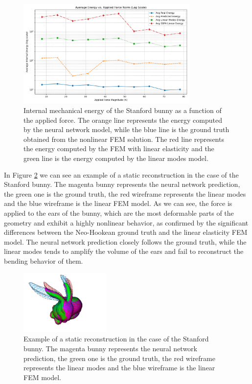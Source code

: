 \begin{figure}[H]
    \centering
    \includegraphics[width=0.8\textwidth]{Images/bunny_static_energy.png}
    \caption{Internal mechanical energy of the Stanford bunny as a function of the applied force. The orange line represents the energy computed by the neural network model, while the blue line is the ground truth obtained from the nonlinear FEM solution. The red line represents the energy computed by the FEM with linear elasticity and the green line is the energy computed by the linear modes model.}
    \label{fig:static_energy_bunny}
    \end{figure}
In  Figure \ref{fig:sofa_example_bunny} we can see an example of a static reconstruction in the case of the Stanford bunny. The magenta bunny represents the neural network prediction, the green one is the ground truth, the red wireframe represents the linear modes and the blue wireframe is the linear FEM model. As we can see, the force is applied  to the ears of the bunny, which are the most deformable parts of the geometry and exhibit a highly nonlinear behavior, as confirmed by the significant differences between the Neo-Hookean ground truth and the linear elasticity FEM model. The neural network prediction closely follows the ground truth, while the linear modes tends to amplify the volume of the ears and fail to reconstruct the bending behavior of them.

\begin{figure}[H]
    \centering
    \includegraphics[width=0.4\textwidth]{Images/sofa_example_bunny.png}
    \caption{Example of a static reconstruction in the case of the Stanford bunny. The magenta bunny represents the neural network prediction, the green one is the ground truth, the red wireframe represents the linear modes and the blue wireframe is the linear FEM model.}
    \label{fig:sofa_example_bunny}
    \end{figure}
    
